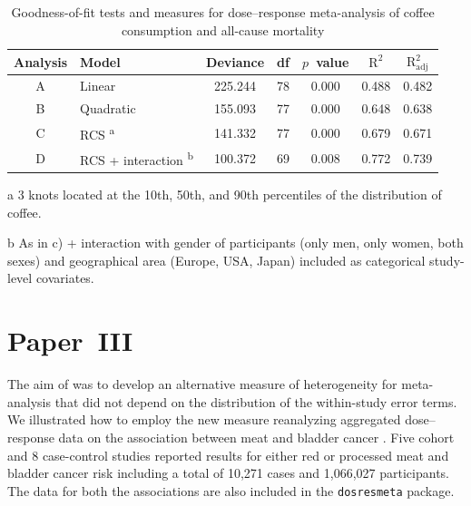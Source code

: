 \documentclass[11pt,a4paper,twoside,openany]{book}\usepackage{knitr}
\begin{document}
{\begin{table}[!h]

\begin{threeparttable}
\caption{\label{tab:gof_tab}Goodness-of-fit tests and measures for dose--response meta-analysis of coffee consumption and all-cause mortality \citep{crippa2014coffee}}
\centering
\begin{tabular}[t]{c>{\centering\arraybackslash}p{5.8cm}ccccc}
\toprule
Analysis & Model & Deviance & df & $p$~value & \textrm{$\mathrm{R^2}$} & \textrm{$\mathrm{R_{\textrm{adj}}^2}$}\\
\midrule
A & Linear & 225.244 & 78 & 0.000 & 0.488 & 0.482\\
B & Quadratic & 155.093 & 77 & 0.000 & 0.648 & 0.638\\
C & RCS \textsuperscript{a} & 141.332 & 77 & 0.000 & 0.679 & 0.671\\
D & RCS + interaction \textsuperscript{b} & 100.372 & 69 & 0.008 & 0.772 & 0.739\\
\bottomrule
\end{tabular}
\begin{tablenotes}
\small
\item[a] 3 knots located at the 10th, 50th, and 90th percentiles of the distribution of coffee.
\item[b] As in c) + interaction with gender of participants (only men, only women, both sexes) and geographical area (Europe, USA, Japan) included as categorical study-level covariates.
\end{tablenotes}
\end{threeparttable}
\end{table}




\section{Paper~III}\label{sec:res_paperIII}



The aim of  was to develop an alternative measure of heterogeneity for meta-analysis that did not depend on the distribution of the within-study error terms. We illustrated how to employ the new measure reanalyzing aggregated dose--response data on the association between meat and bladder cancer \citep{crippa2016red}. Five cohort and 8 case-control studies reported results for either red or processed meat and bladder cancer risk including a total of 10,271 cases and 1,066,027 participants. The data for both the associations are also included in the \texttt{dosresmeta} package.

}
\end{document}
